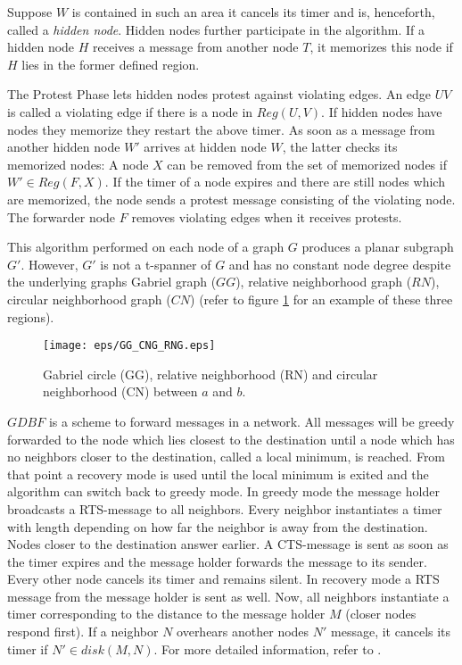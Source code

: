 Suppose $W $ is contained in such an area it cancels its timer and is, henceforth, called a \emph{hidden node}.
Hidden nodes further participate in the algorithm.
If a hidden node $H $ receives a message from another node $T $, it memorizes this node if $H $ lies in the former defined region. 

The Protest Phase lets hidden nodes protest against violating edges.
An edge $UV $ is called a violating edge if there is a node in $Reg(U, V) $.
If hidden nodes have nodes they memorize they restart the above timer.
As soon as a message from another hidden node $W' $ arrives at hidden node $W $, the latter checks its memorized nodes:
A node $X $ can be removed from the set of memorized nodes if $W' \in Reg(F,X) $.
If the timer of a node expires and there are still nodes which are memorized, the node sends a protest message consisting of the violating node.
The forwarder node $F $ removes violating edges when it receives protests.

This algorithm performed on each node of a graph $G $ produces a planar subgraph $G' $.
However, $G' $ is not a t-spanner of $G $ and has no constant node degree despite the underlying graphs Gabriel graph ($GG $), relative neighborhood graph ($RN $), circular neighborhood graph ($CN$) (refer to figure \ref{fig:GG_CNG_RNG} for an example of these three regions).


\begin{figure}[h!]
\centering
\texttt{[image: eps/GG\_CNG\_RNG.eps]}
\caption{Gabriel circle (GG), relative neighborhood (RN) and circular neighborhood (CN) between $a $ and $b $.}
\label{fig:GG_CNG_RNG}
\end{figure}

$GDBF $ is a scheme to forward messages in a network.
All messages will be greedy forwarded to the node which lies closest to the destination until a node which has no neighbors closer to the destination, called a local minimum, is reached.
From that point a recovery mode is used until the local minimum is exited and the algorithm can switch back to greedy mode.
In greedy mode the message holder broadcasts a RTS-message to all neighbors.
Every neighbor instantiates a timer with length depending on how far the neighbor is away from the destination. 
Nodes closer to the destination answer earlier.
A CTS-message is sent as soon as the timer expires and the message holder forwards the message to its sender. 
Every other node cancels its timer and remains silent.
In recovery mode a RTS message from the message holder is sent as well.
Now, all neighbors instantiate a timer corresponding to the distance to the message holder $M $ (closer nodes respond first).
If a neighbor $N $ overhears another nodes $N' $ message, it cancels its timer if $N' \in disk(M, N) $.
For more detailed information, refer to \cite{Chawla2006}.

